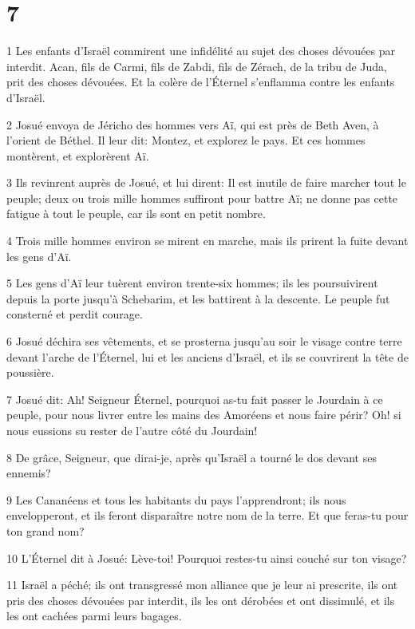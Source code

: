 \chapter{7}

\par 1 Les enfants d'Israël commirent une infidélité au sujet des choses dévouées par interdit. Acan, fils de Carmi, fils de Zabdi, fils de Zérach, de la tribu de Juda, prit des choses dévouées. Et la colère de l'Éternel s'enflamma contre les enfants d'Israël.
\par 2 Josué envoya de Jéricho des hommes vers Aï, qui est près de Beth Aven, à l'orient de Béthel. Il leur dit: Montez, et explorez le pays. Et ces hommes montèrent, et explorèrent Aï.
\par 3 Ils revinrent auprès de Josué, et lui dirent: Il est inutile de faire marcher tout le peuple; deux ou trois mille hommes suffiront pour battre Aï; ne donne pas cette fatigue à tout le peuple, car ils sont en petit nombre.
\par 4 Trois mille hommes environ se mirent en marche, mais ils prirent la fuite devant les gens d'Aï.
\par 5 Les gens d'Aï leur tuèrent environ trente-six hommes; ils les poursuivirent depuis la porte jusqu'à Schebarim, et les battirent à la descente. Le peuple fut consterné et perdit courage.
\par 6 Josué déchira ses vêtements, et se prosterna jusqu'au soir le visage contre terre devant l'arche de l'Éternel, lui et les anciens d'Israël, et ils se couvrirent la tête de poussière.
\par 7 Josué dit: Ah! Seigneur Éternel, pourquoi as-tu fait passer le Jourdain à ce peuple, pour nous livrer entre les mains des Amoréens et nous faire périr? Oh! si nous eussions su rester de l'autre côté du Jourdain!
\par 8 De grâce, Seigneur, que dirai-je, après qu'Israël a tourné le dos devant ses ennemis?
\par 9 Les Cananéens et tous les habitants du pays l'apprendront; ils nous envelopperont, et ils feront disparaître notre nom de la terre. Et que feras-tu pour ton grand nom?
\par 10 L'Éternel dit à Josué: Lève-toi! Pourquoi restes-tu ainsi couché sur ton visage?
\par 11 Israël a péché; ils ont transgressé mon alliance que je leur ai prescrite, ils ont pris des choses dévouées par interdit, ils les ont dérobées et ont dissimulé, et ils les ont cachées parmi leurs bagages.
